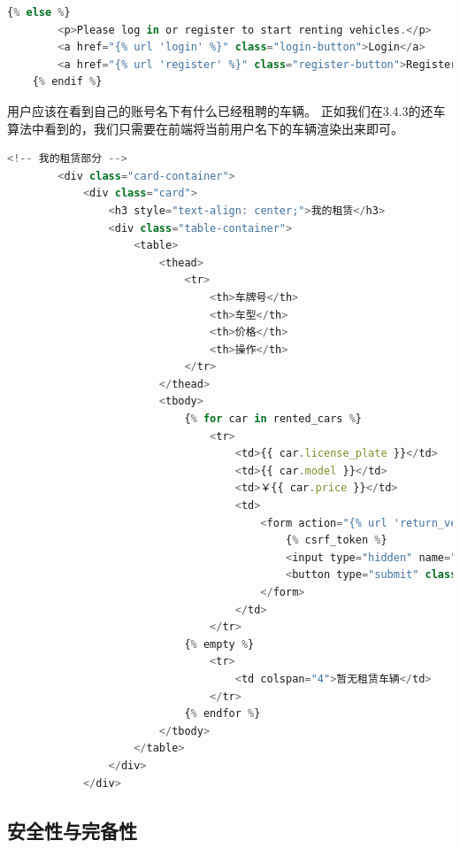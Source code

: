 \documentclass[UTF8,a4paper,12pt]{ctexart}
\begin{document}
\begin{lstlisting}[language=JavaScript]
    {% else %}
        <p>Please log in or register to start renting vehicles.</p>
        <a href="{% url 'login' %}" class="login-button">Login</a>
        <a href="{% url 'register' %}" class="register-button">Register</a>
    {% endif %}
\end{lstlisting}

用户应该在看到自己的账号名下有什么已经租聘的车辆。
正如我们在3.4.3的还车算法中看到的，我们只需要在前端将当前用户名下的车辆渲染出来即可。

\begin{lstlisting}[language=JavaScript]
    <!-- 我的租赁部分 -->
        <div class="card-container">
            <div class="card">
                <h3 style="text-align: center;">我的租赁</h3>
                <div class="table-container">
                    <table>
                        <thead>
                            <tr>
                                <th>车牌号</th>
                                <th>车型</th>
                                <th>价格</th>
                                <th>操作</th>
                            </tr>
                        </thead>
                        <tbody>
                            {% for car in rented_cars %}
                                <tr>
                                    <td>{{ car.license_plate }}</td>
                                    <td>{{ car.model }}</td>
                                    <td>￥{{ car.price }}</td>
                                    <td>
                                        <form action="{% url 'return_vehicle' %}" method="POST" style="display:inline;">
                                            {% csrf_token %}
                                            <input type="hidden" name="vehicle_id" value="{{ car.license_plate }}">
                                            <button type="submit" class="btn-danger">还车</button>
                                        </form>
                                    </td>
                                </tr>
                            {% empty %}
                                <tr>
                                    <td colspan="4">暂无租赁车辆</td>
                                </tr>
                            {% endfor %}
                        </tbody>
                    </table>
                </div>
            </div>
\end{lstlisting}

\subsection{安全性与完备性}
\end{document}
